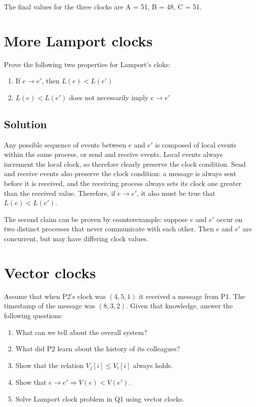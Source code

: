 \documentclass[12pt,a4paper,titlepage]{article}
\begin{document}
The final values for the three clocks are A = 51, B = 48, C = 51.

\section{More Lamport clocks}

Prove the following two properties for Lamport's cloks:\\
\begin{enumerate}
\item If $e \to e'$, then $L(e) < L(e')$\\
\item $L(e) < L(e')$ does not necessarily imply $e \to e'$
\end{enumerate}

\subsection{Solution}

Any possible sequence of events between $e$ and $e'$ is composed of local events within the same process, or send and receive events. Local events always increment the local clock, so therefore clearly preserve the clock condition. Send and receive events also preserve the clock condition: a message is always sent before it is received, and the receiving process always sets its clock one greater than the received value. Therefore, if $e \to e'$, it also must be true that $L(e) < L(e')$.

The second claim can be proven by counterexample: suppose $e$ and $e'$ occur on two distinct processes that never communicate with each other. Then $e$ and $e'$ are concurrent, but may have differing clock values.

\section{Vector clocks}

Assume that when P2's clock was $(4, 5, 1)$ it received a message from P1. The timestamp of the message was $(8, 3, 2)$. Given that knowledge, answer the following questions:

\begin{enumerate}
\item What can we tell about the overall system?
\item What did P2 learn about the history of its colleagues?
\item Show that the relation $V_j[i] \leq V_i[i]$ always holds.
\item Show that $e \to e' \Rightarrow V(e) < V(e')$.
\item Solve Lamport clock problem in Q1 using vector clocks.
\end{enumerate}
\end{document}
